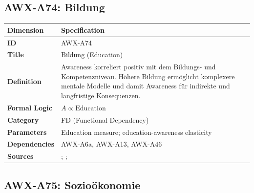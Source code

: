 
\subsection{AWX-A74: Bildung}

\begin{table}[htbp]
\small
\begin{tabular}{p{3cm}p{11cm}}
\toprule
\textbf{Dimension} & \textbf{Specification} \\
\midrule
\textbf{ID} & AWX-A74 \\
\textbf{Title} & Bildung (Education) \\
\textbf{Definition} & Awareness korreliert positiv mit dem Bildungs- und Kompetenzniveau. Höhere Bildung ermöglicht komplexere mentale Modelle und damit Awareness für indirekte und langfristige Konsequenzen. \\
\textbf{Formal Logic} & $A \propto \text{Education}$ \\
\textbf{Category} & FD (Functional Dependency) \\
\textbf{Parameters} & Education measure; education-awareness elasticity \\
\textbf{Dependencies} & AWX-A6a, AWX-A13, AWX-A46 \\
\textbf{Sources} & \citet{lusardi2014economic}; \citet{heckman2006effects}; \citet{hanushek2012knowledge} \\
\bottomrule
\end{tabular}
\end{table}


\subsection{AWX-A75: Sozioökonomie}


